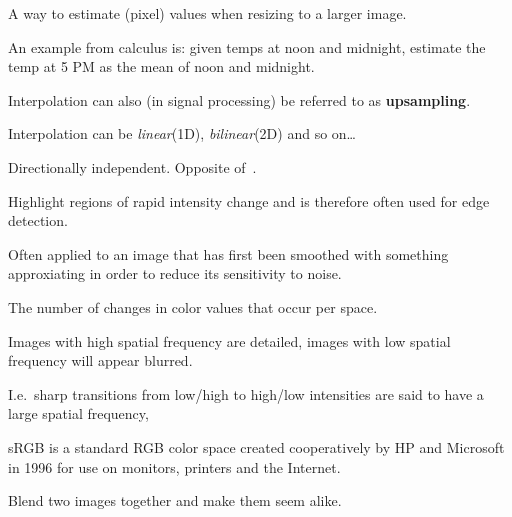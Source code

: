 \begin{definition}[Interpolation]
    A way to estimate (pixel) values when resizing to a larger image.

    An example from calculus is: given temps at noon and midnight, estimate
    the temp at 5 PM as the mean of noon and midnight.

    Interpolation can also (in signal processing) be referred to as 
    \textbf{upsampling}.

    Interpolation can be \textit{linear}(1D), \textit{bilinear}(2D) and so on\dots

\end{definition}

\begin{definition}[Isotropy]\label{isotropy}
    Directionally independent. Opposite of~.
\end{definition}

\begin{definition}[Laplacian]
    Highlight regions of rapid intensity change and is therefore often used for
    edge detection.

    Often applied to an image that has first been smoothed with something
    approxiating in order to reduce its sensitivity to noise.

\end{definition}

\begin{definition}
    The number of changes in color values that occur per space.

    Images with high spatial frequency are detailed, images with low spatial 
    frequency will appear blurred.

    I.e.\ sharp transitions from low/high to high/low intensities are said
    to have a large spatial frequency,

\end{definition}


\begin{definition}[SRGB]
    sRGB is a standard RGB color space created cooperatively by HP and
    Microsoft in 1996 for use on monitors, printers and the Internet.

\end{definition}


\begin{definition}
    Blend two images together and make them seem alike.
\end{definition}

